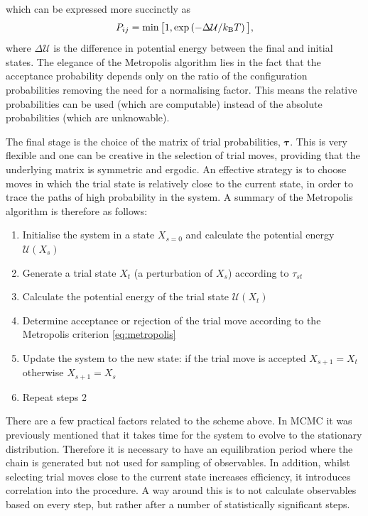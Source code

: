 which can be expressed more succinctly as
\begin{equation}
	\label{eq:metropolis}
	 P_{ij}=\min\big[1,\exp\left(-\Delta \mathcal{U}/k_\text{B} T\right)\big],
\end{equation}
where $\Delta \mathcal{U}$ is the difference in potential energy between the final and initial states.
The elegance of the Metropolis algorithm lies in the fact that the acceptance probability depends only on the ratio of the configuration probabilities removing the need for a normalising factor.
This means the relative probabilities can be used (which are computable) instead of the absolute probabilities (which are unknowable).

The final stage is the choice of the matrix of trial probabilities, $\bm{\tau}$. 
This is very flexible and one can be creative in the selection of trial moves, providing that the underlying matrix is symmetric and ergodic.
An effective strategy is to choose moves in which the trial state is relatively close to the current state, in order to trace the paths of high probability in the system.
A summary of the Metropolis algorithm is therefore as follows:
\begin{enumerate}
	\item Initialise the system in a state $X_{s=0}$ and calculate the potential energy $\mathcal{U}\left(X_s\right)$
	\item Generate a trial state $X_t$ (a perturbation of $X_s$) according to $\tau_{st}$
	\item Calculate the potential energy of the trial state $\mathcal{U}\left(X_t\right)$
	\item Determine acceptance or rejection of the trial move according to the Metropolis criterion \eqref{eq:metropolis}
	\item Update the system to the new state: if the trial move is accepted $X_{s+1}=X_{t}$ otherwise $X_{s+1}=X_{s}$
	\item Repeat steps 2
\end{enumerate}
There are a few practical factors related to the scheme above.
In MCMC it was previously mentioned that it takes time for the system to evolve to the stationary distribution.
Therefore it is necessary to have an equilibration period where the chain is generated but not used for sampling of observables.
In addition, whilst selecting trial moves close to the current state increases efficiency, it introduces correlation into the procedure.
A way around this is to not calculate observables based on every step, but rather after a number of statistically significant steps.

